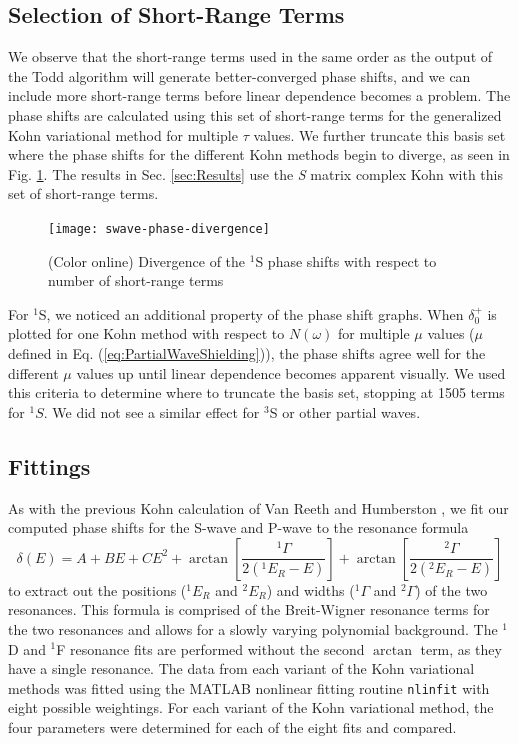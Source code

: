 \documentclass[preprint,showpacs,preprintnumbers,amsmath,amssymb]{revtex4}
\begin{document}
\subsection{Selection of Short-Range Terms}
\label{sec:Truncation}
We observe that the short-range terms used in the same order as the output of the Todd algorithm will generate better-converged phase shifts, and we can include more short-range terms before linear dependence becomes a problem. The phase shifts are calculated using this set of short-range terms for the generalized Kohn variational method for multiple $\tau$ values. We further truncate this basis set where the phase shifts for the different Kohn methods begin to diverge, as seen in Fig. \ref{fig:swave-phase-divergence}. The results in Sec. \ref{sec:Results} use the \emph{S} matrix complex Kohn with this set of short-range terms.

\begin{figure}[H]
	\centering
	\texttt{[image: swave-phase-divergence]}
	\caption{(Color online) Divergence of the $^1$S phase shifts with respect to number of short-range terms}
	\label{fig:swave-phase-divergence}
\end{figure}

For $^1$S, we noticed an additional property of the phase shift graphs. When $\delta_0^+$ is plotted for one Kohn method with respect to $N(\omega)$ for multiple $\mu$ values ($\mu$ defined in Eq. (\ref{eq:PartialWaveShielding})), the phase shifts agree well for the different $\mu$ values up until linear dependence becomes apparent visually. We used this criteria to determine where to truncate the basis set, stopping at 1505 terms for $^1S$. We did not see a similar effect for $^3$S or other partial waves.


\subsection{Fittings}
As with the previous Kohn calculation of Van Reeth and Humberston \cite{VanReeth2004}, we fit our computed phase shifts for the S-wave and P-wave to the resonance formula
\begin{equation}
\label{eq:ResonanceFit}
\delta(E) = A + B E + C E^2 + \arctan \left[ \frac{^1\Gamma}{2(^1E_R - E)} \right] + \arctan \left[ \frac{^2\Gamma}{2(^2E_R - E)} \right]
\end{equation}
to extract out the positions ($^1E_R$ and $^2E_R$) and widths
($^1\Gamma$ and $^2\Gamma$) of the two resonances. 
This formula is comprised of the Breit-Wigner resonance
terms for the two resonances and allows for a slowly varying polynomial
background. The $^1$D and $^1$F resonance fits are performed without the second $\arctan$ term, as they have a single resonance. 
The data from each variant of the Kohn variational methods was fitted using the MATLAB \cite{MATLAB} nonlinear fitting routine \texttt{nlinfit} with eight possible weightings.
For each variant of the Kohn variational method, the four parameters were determined for each of the eight fits and compared.
\end{document}
